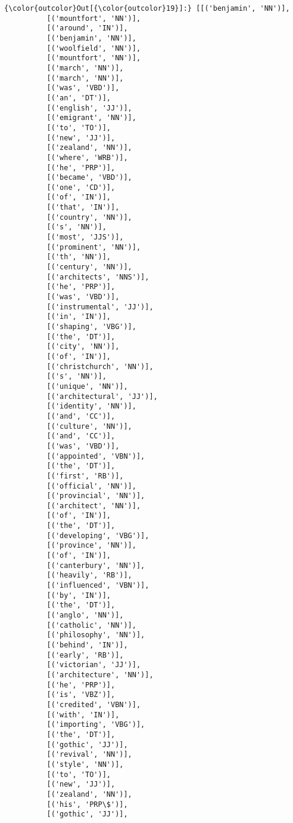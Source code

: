 \documentclass[11pt]{article}
\begin{document}
\begin{Verbatim}[commandchars=\\\{\}]
{\color{outcolor}Out[{\color{outcolor}19}]:} [[('benjamin', 'NN')],
          [('mountfort', 'NN')],
          [('around', 'IN')],
          [('benjamin', 'NN')],
          [('woolfield', 'NN')],
          [('mountfort', 'NN')],
          [('march', 'NN')],
          [('march', 'NN')],
          [('was', 'VBD')],
          [('an', 'DT')],
          [('english', 'JJ')],
          [('emigrant', 'NN')],
          [('to', 'TO')],
          [('new', 'JJ')],
          [('zealand', 'NN')],
          [('where', 'WRB')],
          [('he', 'PRP')],
          [('became', 'VBD')],
          [('one', 'CD')],
          [('of', 'IN')],
          [('that', 'IN')],
          [('country', 'NN')],
          [('s', 'NN')],
          [('most', 'JJS')],
          [('prominent', 'NN')],
          [('th', 'NN')],
          [('century', 'NN')],
          [('architects', 'NNS')],
          [('he', 'PRP')],
          [('was', 'VBD')],
          [('instrumental', 'JJ')],
          [('in', 'IN')],
          [('shaping', 'VBG')],
          [('the', 'DT')],
          [('city', 'NN')],
          [('of', 'IN')],
          [('christchurch', 'NN')],
          [('s', 'NN')],
          [('unique', 'NN')],
          [('architectural', 'JJ')],
          [('identity', 'NN')],
          [('and', 'CC')],
          [('culture', 'NN')],
          [('and', 'CC')],
          [('was', 'VBD')],
          [('appointed', 'VBN')],
          [('the', 'DT')],
          [('first', 'RB')],
          [('official', 'NN')],
          [('provincial', 'NN')],
          [('architect', 'NN')],
          [('of', 'IN')],
          [('the', 'DT')],
          [('developing', 'VBG')],
          [('province', 'NN')],
          [('of', 'IN')],
          [('canterbury', 'NN')],
          [('heavily', 'RB')],
          [('influenced', 'VBN')],
          [('by', 'IN')],
          [('the', 'DT')],
          [('anglo', 'NN')],
          [('catholic', 'NN')],
          [('philosophy', 'NN')],
          [('behind', 'IN')],
          [('early', 'RB')],
          [('victorian', 'JJ')],
          [('architecture', 'NN')],
          [('he', 'PRP')],
          [('is', 'VBZ')],
          [('credited', 'VBN')],
          [('with', 'IN')],
          [('importing', 'VBG')],
          [('the', 'DT')],
          [('gothic', 'JJ')],
          [('revival', 'NN')],
          [('style', 'NN')],
          [('to', 'TO')],
          [('new', 'JJ')],
          [('zealand', 'NN')],
          [('his', 'PRP\$')],
          [('gothic', 'JJ')],

\end{Verbatim}
\end{document}
